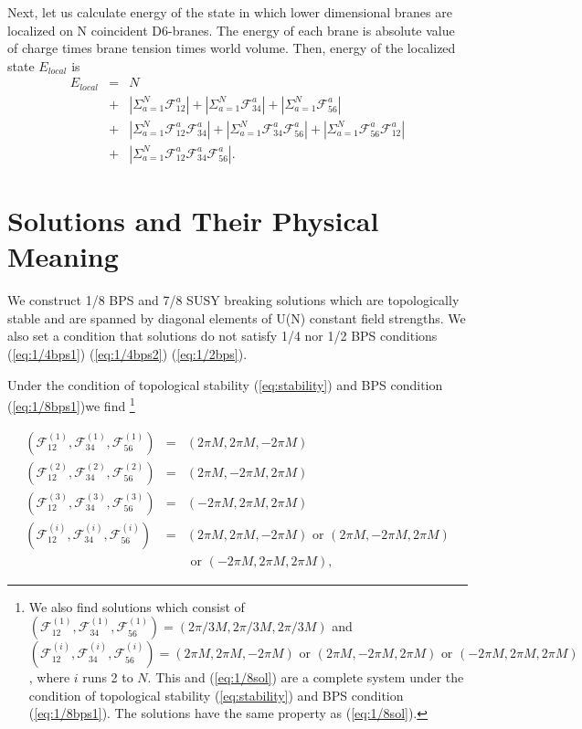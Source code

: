 \documentclass[a4paper,12pt]{article}
\begin{document}
Next, let us calculate energy of the state in which lower dimensional branes are localized on N coincident D6-branes. The energy of each brane is absolute value of charge times brane tension times world volume. Then, energy of the localized state $E_{local}$ is
\begin{eqnarray}
E_{local} &=& N \nonumber \\
        &+& |\Sigma_{a=1}^N \mathcal{F}_{12}^a|+ |\Sigma_{a=1}^N \mathcal{F}_{34}^a|+ |\Sigma_{a=1}^N \mathcal{F}_{56}^a| \nonumber \\
        &+& |\Sigma_{a=1}^N \mathcal{F}_{12}^a\mathcal{F}_{34}^a| +|\Sigma_{a=1}^N \mathcal{F}_{34}^a\mathcal{F}_{56}^a| + |\Sigma_{a=1}^N \mathcal{F}_{56}^a\mathcal{F}_{12}^a| \nonumber \\
        &+& |\Sigma_{a=1}^N \mathcal{F}_{12}^a\mathcal{F}_{34}^a\mathcal{F}_{56}^a|. \label{eq:local}
\end{eqnarray}

\section{Solutions and Their Physical Meaning}
We construct 1/8 BPS and 7/8 SUSY breaking solutions which are topologically stable and are spanned by diagonal elements of U(N) constant field strengths. We  also set a condition that solutions do not satisfy 1/4 nor 1/2 BPS conditions (\ref{eq:1/4bps1}) (\ref{eq:1/4bps2}) (\ref{eq:1/2bps}). 

Under the condition of topological stability (\ref{eq:stability}) and BPS condition (\ref{eq:1/8bps1})we find \footnote{We also find solutions which consist of $(\mathcal{F}_{12}^{(1)},\mathcal{F}_{34}^{(1)},\mathcal{F}_{56}^{(1)})=(2 \pi/3 M, 2 \pi/3 M, 2 \pi/3 M)$ and $(\mathcal{F}_{12}^{(i)},\mathcal{F}_{34}^{(i)},\mathcal{F}_{56}^{(i)})=(2 \pi M,2 \pi M,-2 \pi M) \mbox{ or } (2 \pi M,-2 \pi M,2 \pi M) \mbox{ or } (-2 \pi M,2 \pi M,2 \pi M) $, where $i$ runs 2 to $N$. This and (\ref{eq:1/8sol}) are a complete system under the condition of topological stability (\ref{eq:stability}) and BPS condition (\ref{eq:1/8bps1}). The solutions have the same property as (\ref{eq:1/8sol}).}   

\begin{eqnarray}
(\mathcal{F}_{12}^{(1)},\mathcal{F}_{34}^{(1)},\mathcal{F}_{56}^{(1)})&=&(2 \pi M,2 \pi M,-2 \pi M) \nonumber \\
(\mathcal{F}_{12}^{(2)},\mathcal{F}_{34}^{(2)},\mathcal{F}_{56}^{(2)})&=&(2 \pi M,-2 \pi M,2 \pi M) \nonumber \\
(\mathcal{F}_{12}^{(3)},\mathcal{F}_{34}^{(3)},\mathcal{F}_{56}^{(3)})&=&(-2 \pi M,2 \pi M,2 \pi M) \nonumber \\
(\mathcal{F}_{12}^{(i)},\mathcal{F}_{34}^{(i)},\mathcal{F}_{56}^{(i)})&=&(2 \pi M,2 \pi M,-2 \pi M) \mbox{ or } (2 \pi M,-2 \pi M,2 \pi M) \nonumber \\ 
&&\mbox{ or } (-2 \pi M,2 \pi M,2 \pi M),  \label{eq:1/8sol}
\end{eqnarray}
\end{document}
